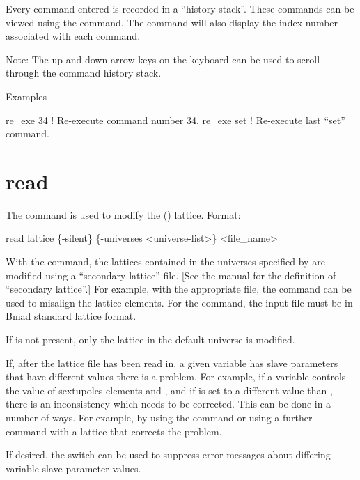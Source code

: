 \vskip 10pt 

Every \tao command entered is recorded in a ``history stack''. These commands can be viewed using
the  command. The  command will also display the index number
associated with each command.

Note: The up and down arrow keys on the keyboard can be used to scroll through the command history
stack.

Examples
\begin{example}
  re_exe 34   ! Re-execute command number 34.
  re_exe set  ! Re-execute last ``set'' command.  
\end{example}

\section{read}
\label{s:read}

The  command is used to modify the (\bmad)  lattice. Format:
\begin{example}
  read lattice \{-silent\} \{-universes <universe-list>\} <file_name>
\end{example}

\vskip 10pt 

With the  command, the  lattices contained in the universes specified by
 are modified using a ``secondary lattice'' file.  [See the \bmad manual for the
definition of ``secondary lattice''.] For example, with the appropriate file, the  command
can be used to misalign the lattice elements. For the  command, the input file must
be in Bmad standard lattice format.

If  is not present, only the  lattice
in the default universe is modified.

If, after the lattice file has been read in, a given \tao variable has slave parameters that have
different values there is a problem. For example, if a \tao variable controls the  value of
sextupoles elements  and , and if  is set to a different value than ,
there is an inconsistency which needs to be corrected. This can be done in a number of ways. For
example, by using the  command or using a further  command with
a lattice that corrects the problem.

If desired, the  switch can be used to suppress error messages about differing \tao
variable slave parameter values.


